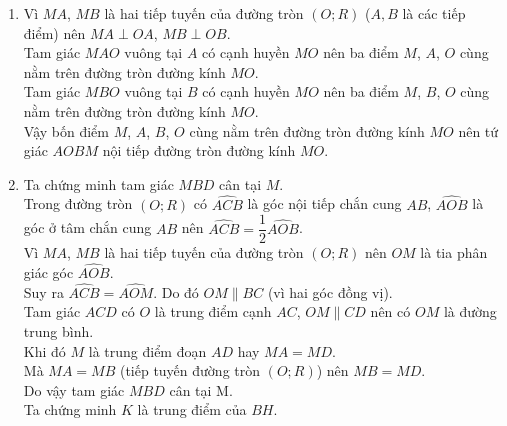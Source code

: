 \begin{bt}[3,0 điểm]
{\begin{center}
        \end{center}
        \begin{enumerate}[1.]
            \item Vì $MA$, $MB$ là hai tiếp tuyến của đường tròn $(O;R)$ ($A,B$ là các tiếp điểm) nên $MA \perp OA$, $MB \perp OB$.\\
                  Tam giác $MAO$ vuông tại $A$ có cạnh huyền $MO$ nên ba điểm $M$, $A$, $O$ cùng nằm trên đường tròn đường kính $MO$.\\
                  Tam giác $MBO$ vuông tại $B$ có cạnh huyền $MO$ nên ba điểm $M$, $B$, $O$ cùng nằm trên đường tròn đường kính $MO$.\\
                  Vậy bốn điểm $M$, $A$, $B$, $O$ cùng nằm trên đường tròn đường kính $MO$ nên tứ giác $AOBM$ nội tiếp đường tròn đường kính $MO$.
            \item Ta chứng minh tam giác $MBD$ cân tại $M$.\\
                  Trong đường tròn $(O;R)$ có $\widehat{ACB}$ là góc nội tiếp chắn cung $AB$, $\widehat{AOB}$ là góc ở tâm chắn cung $AB$ nên $\widehat{ACB}=\dfrac12 \widehat{AOB}$. \\
                  Vì $MA$, $MB$ là hai tiếp tuyến của đường tròn $(O;R)$ nên $OM$ là tia phân giác góc $\widehat{AOB}$.\\
                  Suy ra $\widehat{ACB}=\widehat{AOM}$. Do đó $OM \parallel BC$ (vì hai góc đồng vị).\\
                  Tam giác $ACD$ có $O$ là trung điểm cạnh $AC$, $OM \parallel CD$ nên có $OM$ là đường trung bình.\\
                  Khi đó $M$ là trung điểm đoạn $AD$ hay $MA=MD$.\\
                  Mà $MA=MB$ (tiếp tuyến đường tròn $(O;R)$) nên $MB=MD$.\\
                  Do vậy tam giác $MBD$ cân tại M.\\
                  Ta chứng minh $K$ là trung điểm của $BH$.\\

\end{enumerate}}
\end{bt}

